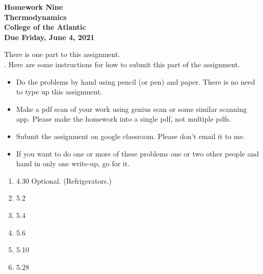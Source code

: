 \documentclass[12pt]{article}
\begin{document}
\pagestyle{empty}
 
\begin{center}
{\LARGE {\bf Homework Nine}}\\
\bigskip
{\Large {\bf Thermodynamics}}\\
\bigskip
{\Large {\bf College of the Atlantic}}\\
\bigskip
{ {\bf Due Friday, June 4, 2021}}\\ 
\end{center}
\medskip


\noindent There is one part to this assignment.\\


.  Here are some
instructions for how to submit this part of the assignment.
\begin{itemize}
  \setlength{\itemsep}{1mm}
\item Do the problems by hand using pencil (or pen) and paper.
  There is no need to type up this assignment.
\item Make a pdf scan of your work using genius scan or some
  similar scanning app.  Please make the homework into a single
  pdf, not multiple pdfs.
\item Submit the assignment on google classroom.  Please don't
  email it to me. 
\item If you want to do one or more of these problems one or two other
  people and hand in only one write-up, go for it. \\
\end{itemize}


\begin{enumerate}
\setlength{\itemsep}{1mm}
\item 4.30 Optional.  (Refrigerators.)
\item 5.2
\item 5.4
\item 5.6
\item 5.10
\item 5.28
\end{enumerate}
\end{document}
